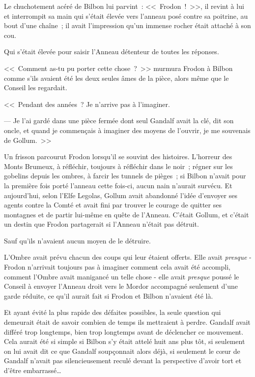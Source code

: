 Le chuchotement acéré de Bilbon lui parvint~: <<~Frodon~!~>>, il revint à lui et interrompit sa main qui s'était élevée vers l'anneau posé contre sa poitrine, au bout d'une chaîne~; il avait l'impression qu'un immense rocher était attaché à son cou.

Qui s'était élevée pour saisir l'Anneau détenteur de toutes les réponses.

<<~Comment as-tu pu porter cette chose~?~>> murmura Frodon à Bilbon comme s'ils avaient été les deux seules âmes de la pièce, alors même que le Conseil les regardait.

<<~Pendant des années~? Je n'arrive pas à l'imaginer.

--- Je l'ai gardé dans une pièce fermée dont seul Gandalf avait la clé, dit son oncle, et quand je commençais à imaginer des moyens de l'ouvrir, je me souvenais de Gollum.~>>

Un frisson parcourut Frodon lorsqu'il se souvint des histoires. L'horreur des Monts Brumeux, à réfléchir, toujours à réfléchir dans le noir~; régner sur les gobelins depuis les ombres, à farcir les tunnels de pièges~; si Bilbon n'avait pour la première fois porté l'anneau cette fois-ci, aucun nain n'aurait survécu. Et aujourd'hui, selon l'Elfe Legolas, Gollum avait abandonné l'idée d'envoyer ses agents contre la Comté et avait fini par trouver le courage de quitter ses montagnes et de partir lui-même en quête de l'Anneau. C'était Gollum, et c'était un destin que Frodon partagerait si l'Anneau n'était pas détruit.

Sauf qu'ils n'avaient aucun moyen de le détruire.

L'Ombre avait prévu chacun des coups qui leur étaient offerts. Elle avait \emph{presque} - Frodon n'arrivait toujours pas à imaginer comment cela avait été accompli, comment l'Ombre avait manigancé un telle chose - elle avait \emph{presque} poussé le Conseil à envoyer l'Anneau droit vers le Mordor accompagné seulement d'une garde réduite, ce qu'il aurait fait si Frodon et Bilbon n'avaient été là.

Et ayant évité la plus rapide des défaites possibles, la seule question qui demeurait était de savoir combien de temps ils mettraient à perdre. Gandalf avait différé trop longtemps, bien trop longtemps avant de déclencher ce mouvement. Cela aurait été si simple si Bilbon s'y était attelé huit ans plus tôt, si seulement on lui avait dit ce que Gandalf soupçonnait alors déjà, si seulement le cœur de Gandalf n'avait pas silencieusement reculé devant la perspective d'avoir tort et d'être embarrassé…

